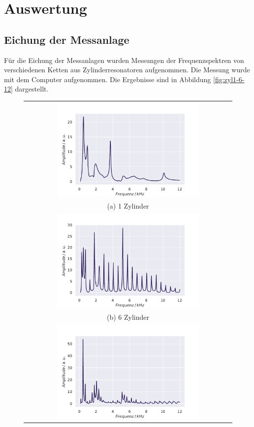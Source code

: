 \section{Auswertung}
\label{sec:auswertung}

\subsection{Eichung der Messanlage}
Für die Eichung der Messanlagen wurden Messungen der Frequenzspektren von verschiedenen Ketten aus Zylinderresonatoren aufgenommen. Die Messung wurde mit dem Computer aufgenommen. Die Ergebnisse sind in Abbildung \ref{fig:zyl1-6-12} dargestellt. 
\begin{figure}[H]
    \centering
    \begin{tabular}{c}
      \includegraphics[width=0.7\textwidth]{Daten/Zyinder/Zylinder_1.pdf} \\
    (a) 1 Zylinder \\[6pt]
     \includegraphics[width=0.7\textwidth]{Daten/Zyinder/Zylinder_6.pdf} \\
    (b) 6 Zylinder \\[6pt]
    \includegraphics[width=0.7\textwidth]{Daten/Zyinder/Zylinder_12.pdf} \\

\end{tabular}
\end{figure}
